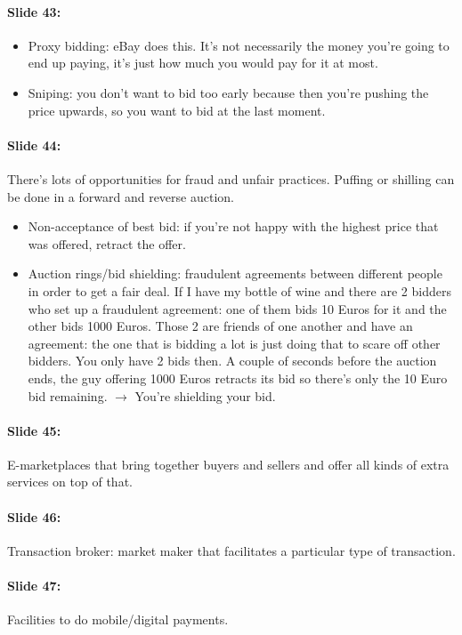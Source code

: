 \documentclass[10pt,a4paper]{report}
\begin{document}
\paragraph{Slide 43:}
\begin{itemize}
\item Proxy bidding: eBay does this. It's not necessarily the money you're going to end up paying, it's just how much you would pay for it at most.
\item Sniping: you don't want to bid too early because then you're pushing the price upwards, so you want to bid at the last moment. 
\end{itemize}

\paragraph{Slide 44:}There's lots of opportunities for fraud and unfair practices. Puffing or shilling can be done in a forward and reverse auction.
\begin{itemize}
\item Non-acceptance of best bid: if you're not happy with the highest price that was offered, retract the offer.
\item Auction rings/bid shielding: fraudulent agreements between different people in order to get a fair deal. If I have my bottle of wine and there are 2 bidders who set up a fraudulent agreement: one of them bids 10 Euros for it and the other bids 1000 Euros. Those 2 are friends of one another and have an agreement: the one that is bidding a lot is just doing that to scare off other bidders. You only have 2 bids then. A couple of seconds before the auction ends, the guy offering 1000 Euros retracts its bid so there's only the 10 Euro bid remaining. $\rightarrow$ You're shielding your bid.
\end{itemize}

\paragraph{Slide 45:}E-marketplaces that bring together buyers and sellers and offer all kinds of extra services on top of that.

\paragraph{Slide 46:}Transaction broker: market maker that facilitates a particular type of transaction.

\paragraph{Slide 47:}Facilities to do mobile/digital payments.
\end{document}
